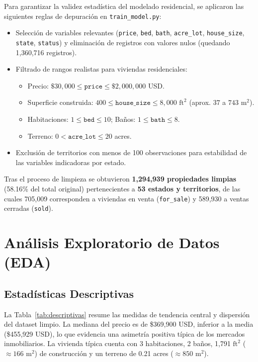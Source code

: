 \documentclass[11pt,a4paper]{article}
\begin{document}
Para garantizar la validez estadística del modelado residencial, se aplicaron las siguientes reglas de depuración en \texttt{train\_model.py}:
\begin{itemize}
    \item Selección de variables relevantes (\texttt{price}, \texttt{bed}, \texttt{bath}, \texttt{acre\_lot}, \texttt{house\_size}, \texttt{state}, \texttt{status}) y eliminación de registros con valores nulos (quedando 1{,}360{,}716 registros).
    \item Filtrado de rangos realistas para viviendas residenciales:
    \begin{itemize}
        \item Precio: $\$30{,}000 \le \texttt{price} \le \$2{,}000{,}000$ USD.
        \item Superficie construida: $400 \le \texttt{house\_size} \le 8{,}000\text{ ft}^2$ (aprox. $37$ a $743\text{ m}^2$).
        \item Habitaciones: $1 \le \texttt{bed} \le 10$; Baños: $1 \le \texttt{bath} \le 8$.
        \item Terreno: $0 < \texttt{acre\_lot} \le 20$ acres.
    \end{itemize}
    \item Exclusión de territorios con menos de 100 observaciones para estabilidad de las variables indicadoras por estado.
\end{itemize}

Tras el proceso de limpieza se obtuvieron \textbf{1{,}294{,}939 propiedades limpias} (58.16\% del total original) pertenecientes a \textbf{53 estados y territorios}, de las cuales 705{,}009 corresponden a viviendas en venta (\texttt{for\_sale}) y 589{,}930 a ventas cerradas (\texttt{sold}).

\section{Análisis Exploratorio de Datos (EDA)}

\subsection{Estadísticas Descriptivas}
La Tabla~\ref{tab:descriptivas} resume las medidas de tendencia central y dispersión del dataset limpio. La mediana del precio es de \$369{,}900 USD, inferior a la media (\$455{,}929 USD), lo que evidencia una asimetría positiva típica de los mercados inmobiliarios. La vivienda típica cuenta con 3 habitaciones, 2 baños, 1{,}791 $\text{ft}^2$ ($\approx 166\text{ m}^2$) de construcción y un terreno de 0.21 acres ($\approx 850\text{ m}^2$).
\end{document}
